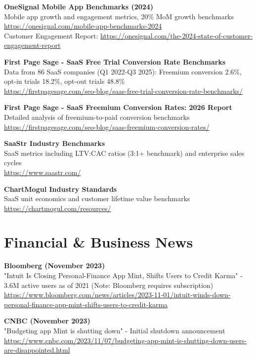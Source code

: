 \documentclass[11pt,a4paper]{report}
\begin{document}
\textbf{OneSignal Mobile App Benchmarks (2024)}\\
Mobile app growth and engagement metrics, 20\% MoM growth benchmarks\\
\url{https://onesignal.com/mobile-app-benchmarks-2024}\\
Customer Engagement Report: \url{https://onesignal.com/the-2024-state-of-customer-engagement-report}

\textbf{First Page Sage - SaaS Free Trial Conversion Rate Benchmarks}\\
Data from 86 SaaS companies (Q1 2022-Q3 2025): Freemium conversion 2.6\%, opt-in trials 18.2\%, opt-out trials 48.8\%\\
\url{https://firstpagesage.com/seo-blog/saas-free-trial-conversion-rate-benchmarks/}

\textbf{First Page Sage - SaaS Freemium Conversion Rates: 2026 Report}\\
Detailed analysis of freemium-to-paid conversion benchmarks\\
\url{https://firstpagesage.com/seo-blog/saas-freemium-conversion-rates/}

\textbf{SaaStr Industry Benchmarks}\\
SaaS metrics including LTV:CAC ratios (3:1+ benchmark) and enterprise sales cycles\\
\url{https://www.saastr.com/}

\textbf{ChartMogul Industry Standards}\\
SaaS unit economics and customer lifetime value benchmarks\\
\url{https://chartmogul.com/resources/}

\section*{Financial \& Business News}

\textbf{Bloomberg (November 2023)}\\
"Intuit Is Closing Personal-Finance App Mint, Shifts Users to Credit Karma" - 3.6M active users as of 2021 (Note: Bloomberg requires subscription)\\
\url{https://www.bloomberg.com/news/articles/2023-11-01/intuit-winds-down-personal-finance-app-mint-shifts-users-to-credit-karma}

\textbf{CNBC (November 2023)}\\
"Budgeting app Mint is shutting down" - Initial shutdown announcement\\
\url{https://www.cnbc.com/2023/11/07/budgeting-app-mint-is-shutting-down-users-are-disappointed.html}
\end{document}
